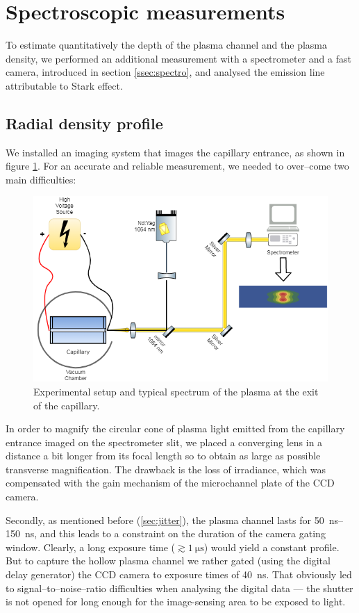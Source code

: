 \documentclass[../main.tex]{subfiles}
\begin{document}
\section{Spectroscopic measurements}\label{sec:spectro}
To estimate quantitatively the depth of the plasma channel and the plasma density, we performed an additional measurement with a spectrometer and a fast camera, introduced in section \ref{ssec:spectro}, and analysed the emission line attributable to Stark effect.

\subsection{Radial density profile}\label{ssec:radial}
We installed an imaging system that images the capillary entrance, as shown in figure \ref{fig:radial_system}. For an accurate and reliable measurement, we needed to over--come two main difficulties:

\begin{figure}
\centering
\includegraphics[width=\textwidth]{./figures/spectro/radial_system.png}
\caption{Experimental setup and typical spectrum of the plasma at the exit of the capillary.}
\label{fig:radial_system}
\end{figure}

In order to magnify the circular cone of plasma light emitted from the capillary entrance imaged on the spectrometer slit, we placed a converging lens in a distance a bit longer from its focal length so to obtain as large as possible transverse magnification. The drawback is the loss of irradiance, which was compensated with the gain mechanism of the microchannel plate of the CCD camera.

Secondly, as mentioned before (\ref{sec:jitter}), the plasma channel lasts for \SIrange{50}{150}{\ns}, and this leads to a constraint on the duration of the camera gating window. Clearly, a long exposure time ($\gtrsim \SI{1}{\us}$) would yield a constant profile. But to capture the hollow plasma channel we rather gated (using the digital delay generator) the CCD camera to exposure times of \SI{40}{\ns}. That obviously led to signal--to--noise--ratio difficulties when analysing the digital data --- the shutter is not opened for long enough for the image-sensing area to be exposed to light.
\end{document}
